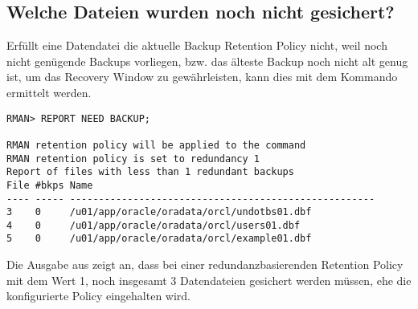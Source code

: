       \subsection{Welche Dateien wurden noch nicht gesichert?}
        Erfüllt eine Datendatei die aktuelle Backup Retention Policy nicht, weil noch nicht genügende Backups vorliegen, bzw. das älteste Backup noch nicht alt genug ist, um das Recovery Window zu gewährleisten, kann dies mit dem Kommando  ermittelt werden.
        \begin{lstlisting}[caption={Wer verstößt gegen die Retention Policy?},label=admin1353,language=rman]
RMAN> REPORT NEED BACKUP;

RMAN retention policy will be applied to the command
RMAN retention policy is set to redundancy 1
Report of files with less than 1 redundant backups
File #bkps Name
---- ----- -----------------------------------------------------
3    0     /u01/app/oracle/oradata/orcl/undotbs01.dbf
4    0     /u01/app/oracle/oradata/orcl/users01.dbf
5    0     /u01/app/oracle/oradata/orcl/example01.dbf
        \end{lstlisting}
        Die Ausgabe aus  zeigt an, dass bei einer redundanzbasierenden Retention Policy mit dem Wert 1, noch insgesamt 3 Datendateien gesichert werden müssen, ehe die konfigurierte Policy eingehalten wird.

